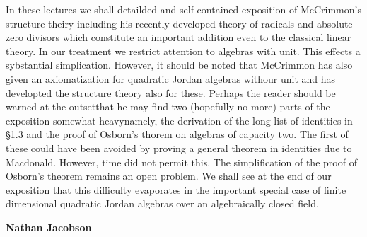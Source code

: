 In these lectures we shall detailded and self-contained exposition of
McCrimmon's  structure theiry including his recently developed theory
of radicals and absolute zero divisors which constitute an important
addition even to the classical linear theory. In our treatment we
restrict attention to algebras with unit. This effects a sybstantial
simplication. However, it should be noted that McCrimmon has also
given an axiomatization for quadratic Jordan algebras withour unit and
has  developted the structure theory also for these. Perhaps the
reader should be warned at the outsetthat he may find two (hopefully
no more) parts of the exposition somewhat heavynamely, the derivation
of the long list of identities in \S 1.3 and the proof of Osborn's
thorem on algebras of capacity two. The first of these could have been
avoided by proving a general theorem in identities due to
Macdonald. However, time did not permit this. The simplification of
the proof of Osborn's theorem remains an open problem. We shall see at
the end of our exposition that this difficulty evaporates in the
important special case of finite dimensional quadratic Jordan algebras
over an algebraically closed field.
\bigskip

\hfill  {\large\bf Nathan Jacobson}

